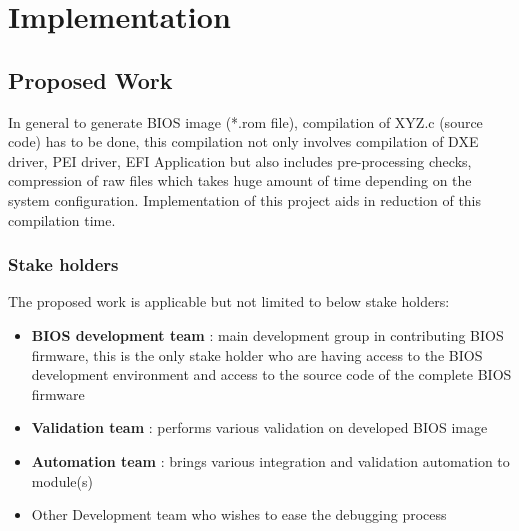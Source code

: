 \chapter{Implementation}\label{chapter-implementation}

\section{Proposed Work}\label{section-proposed-work}
In general to generate BIOS image (*.rom file), compilation of XYZ.c (source code) has to be done, this compilation not only involves compilation of DXE driver, PEI driver, EFI Application but also includes pre-processing checks, compression of raw files which takes huge amount of time depending on the system configuration. Implementation of this project aids in reduction of this compilation time.

\subsection{Stake holders}\label{subsection-stack-holders}
The proposed work is applicable but not limited to below stake holders:
\begin{itemize}
	\item \textbf{BIOS development team} : main development group in contributing BIOS firmware, this is the only stake holder who are having access to the BIOS development environment and access to the source code of the complete BIOS firmware
	\item \textbf{Validation team} : performs various validation on developed BIOS image
	\item \textbf{Automation team} : brings various integration and validation automation to module(s)
	\item Other Development team who wishes to ease the debugging process
\end{itemize}

